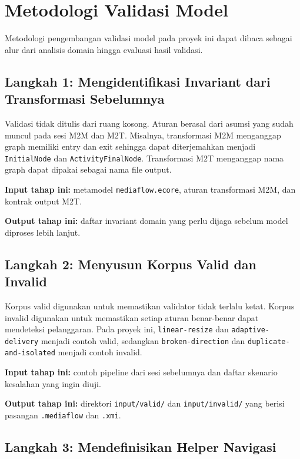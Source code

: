 \section{Metodologi Validasi Model}

Metodologi pengembangan validasi model pada proyek ini dapat dibaca sebagai alur dari analisis domain hingga evaluasi hasil validasi.

\subsection[Langkah 1: Mengidentifikasi Invariant]{Langkah 1: Mengidentifikasi Invariant dari Transformasi Sebelumnya}

Validasi tidak ditulis dari ruang kosong. Aturan berasal dari asumsi yang sudah muncul pada sesi M2M dan M2T. Misalnya, transformasi M2M menganggap graph memiliki entry dan exit sehingga dapat diterjemahkan menjadi \texttt{InitialNode} dan \texttt{ActivityFinalNode}. Transformasi M2T menganggap nama graph dapat dipakai sebagai nama file output.

\textbf{Input tahap ini:} metamodel \texttt{mediaflow.ecore}, aturan transformasi M2M, dan kontrak output M2T.

\textbf{Output tahap ini:} daftar invariant domain yang perlu dijaga sebelum model diproses lebih lanjut.

\subsection{Langkah 2: Menyusun Korpus Valid dan Invalid}

Korpus valid digunakan untuk memastikan validator tidak terlalu ketat. Korpus invalid digunakan untuk memastikan setiap aturan benar-benar dapat mendeteksi pelanggaran. Pada proyek ini, \texttt{linear-resize} dan \texttt{adaptive-delivery} menjadi contoh valid, sedangkan \texttt{broken-direction} dan \texttt{duplicate-and-isolated} menjadi contoh invalid.

\textbf{Input tahap ini:} contoh pipeline dari sesi sebelumnya dan daftar skenario kesalahan yang ingin diuji.

\textbf{Output tahap ini:} direktori \texttt{input/valid/} dan \texttt{input/invalid/} yang berisi pasangan \texttt{.mediaflow} dan \texttt{.xmi}.

\subsection{Langkah 3: Mendefinisikan Helper Navigasi}

